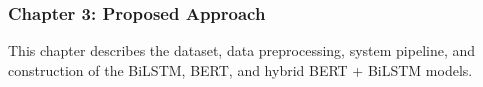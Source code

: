 \subsubsection*{Chapter 3: Proposed Approach}
This chapter describes the dataset, data preprocessing, system pipeline, and construction of the BiLSTM, BERT, and hybrid BERT + BiLSTM models.

% 
% 
% 
% 
% 
% 
% 
% 
